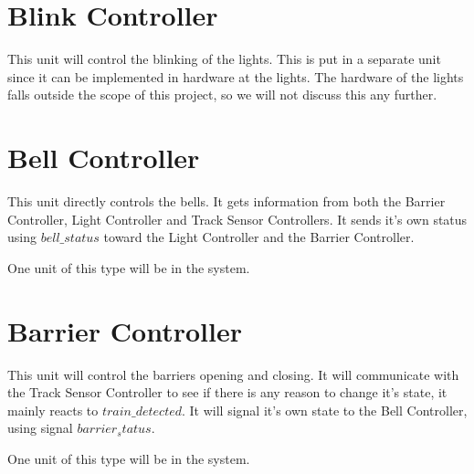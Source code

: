 \documentclass[final]{report}
\begin{document}
\section{Blink Controller}
This unit will control the blinking of the lights.
This is put in a separate unit since it can be implemented in hardware at the lights.
The hardware of the lights falls outside the scope of this project, so we will not discuss this any further.

\section{Bell Controller}
This unit directly controls the bells.
It gets information from both the Barrier Controller, Light Controller and Track Sensor Controllers.
It sends it's own status using $bell\_status$ toward the Light Controller and the Barrier Controller.

One unit of this type will be in the system.

\section{Barrier Controller}
This unit will control the barriers opening and closing.
It will communicate with the Track Sensor Controller to see if there is any reason to change it's state, it mainly reacts to $train\_detected$.
It will signal it's own state to the Bell Controller, using signal $barrier_status$.

One unit of this type will be in the system.
\end{document}
